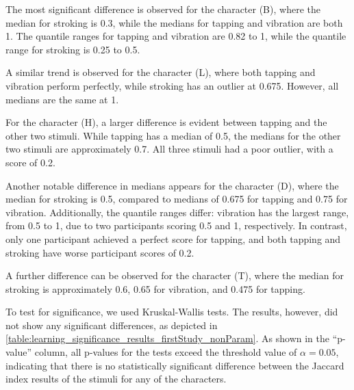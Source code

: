 The most significant difference is observed for the character (B), where the median for stroking is 0.3, while the medians for tapping and vibration are both 1. The quantile ranges for tapping and vibration are 0.82 to 1, while the quantile range for stroking is 0.25 to 0.5.

A similar trend is observed for the character (L), where both tapping and vibration perform perfectly, while stroking has an outlier at 0.675. However, all medians are the same at 1.

For the character (H), a larger difference is evident between tapping and the other two stimuli. While tapping has a median of 0.5, the medians for the other two stimuli are approximately 0.7. All three stimuli had a poor outlier, with a score of 0.2.

Another notable difference in medians appears for the character (D), where the median for stroking is 0.5, compared to medians of 0.675 for tapping and 0.75 for vibration. Additionally, the quantile ranges differ: vibration has the largest range, from 0.5 to 1, due to two participants scoring 0.5 and 1, respectively. In contrast, only one participant achieved a perfect score for tapping, and both tapping and stroking have worse participant scores of 0.2.

A further difference can be observed for the character (T), where the median for stroking is approximately 0.6, 0.65 for vibration, and 0.475 for tapping.



To test for significance, we used Kruskal-Wallis tests. The results, however, did not show any significant differences, as depicted in \autoref{table:learning_significance_results_firstStudy_nonParam}. 
As shown in the \enquote{p-value} column, all p-values for the tests exceed the threshold value of $\alpha = 0.05$, indicating that there is no statistically significant difference between the Jaccard index results of the stimuli for any of the characters.

